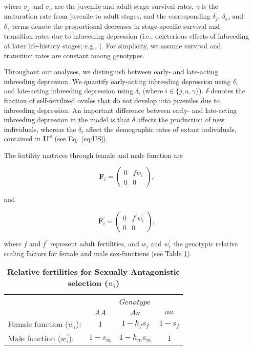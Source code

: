 \documentclass[11pt,draft]{article}
\def\mbf#1{\mathbf{#1}}
\begin{document}
\noindent where $\sigma_j$ and $\sigma_a$ are the juvenile and adult stage survival rates, $\gamma$ is the maturation rate from juvenile to adult stages, and the corresponding $\delta_j$, $\delta_a$, and $\delta_{\gamma}$ terms denote the proportional decreases in stage-specific survival and transition rates due to inbreeding depression (i.e., deleterious effects of inbreeding at later life-history stages; e.g., \citealt{HarderRoutely2006}). For simplicity, we assume survival and transition rates are constant among genotypes. 

Throughout our analyses, we distinguish between early- and late-acting inbreeding depression. We quantify early-acting inbreeding depression using $\delta$, and late-acting inbreeding depression using $\delta_i$ (where $i \in \{j,a,\gamma\}$). $\delta$ denotes the fraction of self-fertilized ovules that do not develop into juveniles due to inbreeding depression. An important difference between early- and late-acting inbreeding depression in the model is that $\delta$ affects the production of new individuals, whereas the $\delta_i$ affect the demographic rates of extant individuals, contained in $\mbf{U}^S$ (see Eq.~\ref{eq:US}).

The fertility matrices through female and male function are
\begin{linenomath*}
\begin{equation}\label{eq:FS}
	\mbf{F}_{i} = \left(
					\begin{array}{cc}
						0 & f w_{i} \\
						0 & 0
					\end{array}
				\right),
\end{equation}
\end{linenomath*}
\noindent and
\begin{linenomath*}
\begin{equation}\label{eq:FX}
	\mbf{F}^{\prime}_{i} = \left(
					\begin{array}{cc}
						0 & f^{\prime} w^{\prime}_{i} \\
						0 & 0
					\end{array}
				\right),
\end{equation}
\end{linenomath*}

\noindent where $f$ and $f^{\prime}$ represent adult fertilities, and $w_{i}$ and $w^{\prime}_{i}$ the genotypic relative scaling factors for female and male sex-functions (see Table \ref{tab:Fitness}). 

\begin{table}[htbp]
 \centering
 \caption{\bf Relative fertilities for Sexually Antagonistic selection ($w_{i}$)}
\label{tab:Fitness}
\begin{tabular}{lccc}
 \toprule
					&  \multicolumn{3}{c}{{\textit{Genotype}}} \\ 
\cline{2-4}
					& $AA$			& $Aa$ 					& $aa$ 		\\ \hline
Female function ($w_{i}$):	& $1$		& $1 - h_f s_f$	& $1 - s_f$ \\	
Male function ($w^{\prime}_{i}$):		& $1 - s_m$& $1 - h_m s_m$	& $1$ 		\\	
\hline
\end{tabular}
\end{table}
\end{document}
